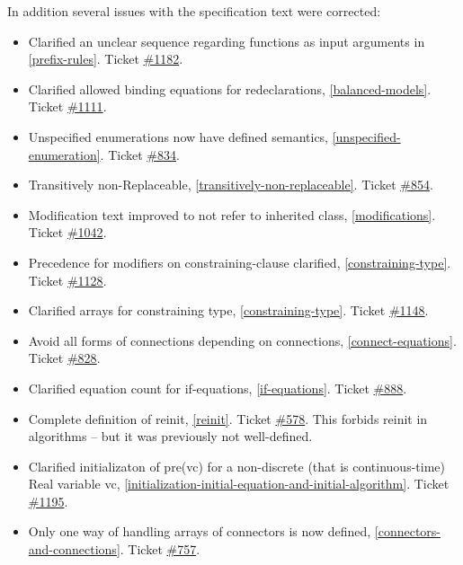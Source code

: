 \documentclass[10pt,a4paper]{report}
\begin{document}
In addition several issues with the specification text were corrected:

\begin{itemize}
\item
  Clarified an unclear sequence regarding functions as input arguments
  in \ref{prefix-rules}. Ticket
  \href{https://trac.modelica.org/Modelica/ticket/1182}{\#1182}.
\item
  Clarified allowed binding equations for redeclarations, \ref{balanced-models}.
  Ticket \protect\hyperlink{1111}{\#1111}.
\item
  Unspecified enumerations now have defined semantics, \ref{unspecified-enumeration}.
  Ticket \href{https://trac.modelica.org/Modelica/ticket/834}{\#834}.
\item
  Transitively non-Replaceable, \ref{transitively-non-replaceable}. Ticket
  \href{https://trac.modelica.org/Modelica/ticket/854}{\#854}.
\item
  Modification text improved to not refer to inherited class, 
  \ref{modifications}. Ticket
  \href{https://trac.modelica.org/Modelica/ticket/1042}{\#1042}.
\item
  Precedence for modifiers on constraining-clause clarified, \ref{constraining-type}. Ticket
  \href{https://trac.modelica.org/Modelica/ticket/1128}{\#1128}.
\item
  Clarified arrays for constraining type, \ref{constraining-type}. Ticket
  \href{https://trac.modelica.org/Modelica/ticket/1148}{\#1148}.
\item
  Avoid all forms of connections depending on connections, 
  \ref{connect-equations}. Ticket
  \href{https://trac.modelica.org/Modelica/ticket/828}{\#828}.
\item
  Clarified equation count for if-equations, \ref{if-equations}. Ticket
  \href{https://trac.modelica.org/Modelica/ticket/888}{\#888}.
\item
  Complete definition of reinit, \ref{reinit}. Ticket
  \href{https://trac.modelica.org/Modelica/ticket/578}{\#578}. This
  forbids reinit in algorithms -- but it was previously not
  well-defined.
\item
  Clarified initializaton of pre(vc) for a non-discrete (that is
  continuous-time) Real variable vc, \ref{initialization-initial-equation-and-initial-algorithm}. Ticket
  \href{https://trac.modelica.org/Modelica/ticket/1195}{\#1195}.
\item
  Only one way of handling arrays of connectors is now defined, 
  \ref{connectors-and-connections}. Ticket \href{https://trac.modelica.org/Modelica/ticket/757}{\#757}.

\end{itemize}
\end{document}
